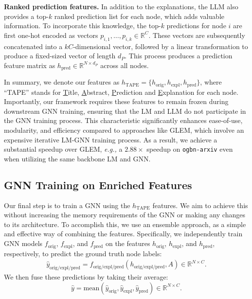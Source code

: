 \documentclass{article}
\newcommand{\eg}{\emph{e.g.,}\xspace}
\begin{document}
\textbf{Ranked prediction features.}
In addition to the explanations, the LLM also provides a top-$k$ ranked prediction list for each node, which adds valuable information. To incorporate this knowledge, the top-$k$ predictions for node $i$ are first one-hot encoded as vectors $p_{i,1}, \dots, p_{i,k} \in \mathbb{R}^{C}$. These vectors are subsequently concatenated into a $kC$-dimensional vector, followed by a linear transformation to produce a fixed-sized vector of length $d_P$. This process produces a prediction feature matrix as $h_{\textrm{pred}} \in \mathbb{R}^{N\times d_P}$ across all nodes.


In summary, we denote our features as $h_\textrm{TAPE} = \{h_\textrm{orig}, h_\textrm{expl}, h_\textrm{pred}\}$, where ``TAPE'' stands for \underline{T}itle, \underline{A}bstract, \underline{P}rediction and \underline{E}xplanation for each node. Importantly, our framework requires these features to remain frozen during downstream GNN training, ensuring that the LM and LLM do not participate in the GNN training process. This characteristic significantly enhances ease-of-use, modularity, and efficiency compared to approaches like GLEM, which involve an expensive iterative LM-GNN training process. As a result, we achieve a substantial speedup over GLEM, \eg a $2.88\times$ speedup on \texttt{ogbn-arxiv} even when utilizing the same backbone LM and GNN.

\subsection{GNN Training on Enriched Features}

Our final step is to train a GNN using the $h_\textrm{TAPE}$ features. We aim to achieve this without increasing the memory requirements of the GNN or making any changes to its architecture. To accomplish this, we use an ensemble approach, as a simple and effective way of combining the features. Specifically, we independently train GNN models $f_{\textrm{orig}}$, $f_{\textrm{expl}}$, and $f_{\textrm{pred}}$ on the features $h_{\textrm{orig}}$, $h_{\textrm{expl}}$, and $h_{\textrm{pred}}$, respectively, to predict the ground truth node labels:
\begin{equation}
\begin{split}
\hat y_{\textrm{orig}/\textrm{expl}/\textrm{pred}} = f_{\textrm{orig}/\textrm{expl}/\textrm{pred}}(h_{\textrm{orig}/\textrm{expl}/\textrm{pred}}, A) \in \mathbb{R}^{N\times C}.
\end{split}
\end{equation}
We then fuse these predictions by taking their average:
\begin{equation}
\hat y = \textrm{mean}(\hat y_{\textrm{orig}}, \hat y_{\textrm{expl}}, \hat y_{\textrm{pred}}) \in \mathbb{R}^{N\times C}.
\end{equation}
\end{document}
